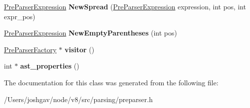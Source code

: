 \begin{DoxyCompactItemize}
\item 
\hyperlink{classv8_1_1internal_1_1_pre_parser_expression}{Pre\+Parser\+Expression} {\bfseries New\+Spread} (\hyperlink{classv8_1_1internal_1_1_pre_parser_expression}{Pre\+Parser\+Expression} expression, int pos, int expr\+\_\+pos)\hypertarget{classv8_1_1internal_1_1_pre_parser_factory_aa88bea85a9fd42ee271ab35773561848}{}\label{classv8_1_1internal_1_1_pre_parser_factory_aa88bea85a9fd42ee271ab35773561848}

\item 
\hyperlink{classv8_1_1internal_1_1_pre_parser_expression}{Pre\+Parser\+Expression} {\bfseries New\+Empty\+Parentheses} (int pos)\hypertarget{classv8_1_1internal_1_1_pre_parser_factory_a788cba89e0ed058cf76b8d68f46e255d}{}\label{classv8_1_1internal_1_1_pre_parser_factory_a788cba89e0ed058cf76b8d68f46e255d}

\item 
\hyperlink{classv8_1_1internal_1_1_pre_parser_factory}{Pre\+Parser\+Factory} $\ast$ {\bfseries visitor} ()\hypertarget{classv8_1_1internal_1_1_pre_parser_factory_abebaca1d94bf5b5d812b27df5826140d}{}\label{classv8_1_1internal_1_1_pre_parser_factory_abebaca1d94bf5b5d812b27df5826140d}

\item 
int $\ast$ {\bfseries ast\+\_\+properties} ()\hypertarget{classv8_1_1internal_1_1_pre_parser_factory_acc5ec170f2fbb0def2a4cfec98a033e4}{}\label{classv8_1_1internal_1_1_pre_parser_factory_acc5ec170f2fbb0def2a4cfec98a033e4}

\end{DoxyCompactItemize}


The documentation for this class was generated from the following file\+:\begin{DoxyCompactItemize}
\item 
/\+Users/joshgav/node/v8/src/parsing/preparser.\+h\end{DoxyCompactItemize}
